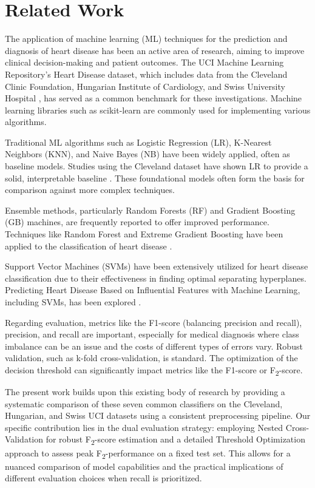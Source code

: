\documentclass{article}
\begin{document}
\section{Related Work} %
\label{sec:related_work} %

The application of machine learning (ML) techniques for the prediction and diagnosis of heart disease has been an active area of research, aiming to improve clinical decision-making and patient outcomes. The UCI Machine Learning Repository's Heart Disease dataset, which includes data from the Cleveland Clinic Foundation, Hungarian Institute of Cardiology, and Swiss University Hospital \cite{UCIHeart}, has served as a common benchmark for these investigations. Machine learning libraries such as scikit-learn \cite{scikit-learn} are commonly used for implementing various algorithms.

Traditional ML algorithms such as Logistic Regression (LR), K-Nearest Neighbors (KNN), and Naive Bayes (NB) have been widely applied, often as baseline models. Studies using the Cleveland dataset have shown LR to provide a solid, interpretable baseline \cite{Paul2021}. These foundational models often form the basis for comparison against more complex techniques.

Ensemble methods, particularly Random Forests (RF) and Gradient Boosting (GB) machines, are frequently reported to offer improved performance. Techniques like Random Forest and Extreme Gradient Boosting have been applied to the classification of heart disease \cite{Pratama2023}.

Support Vector Machines (SVMs) have been extensively utilized for heart disease classification due to their effectiveness in finding optimal separating hyperplanes. Predicting Heart Disease Based on Influential Features with Machine Learning, including SVMs, has been explored \cite{Dubey2021}.

Regarding evaluation, metrics like the F1-score (balancing precision and recall), precision, and recall are important, especially for medical diagnosis where class imbalance can be an issue and the costs of different types of errors vary. Robust validation, such as k-fold cross-validation, is standard. The optimization of the decision threshold can significantly impact metrics like the F1-score or F\textsubscript{2}-score.

The present work builds upon this existing body of research by providing a systematic comparison of these seven common classifiers on the Cleveland, Hungarian, and Swiss UCI datasets using a consistent preprocessing pipeline. Our specific contribution lies in the dual evaluation strategy: employing Nested Cross-Validation for robust F\textsubscript{2}-score estimation and a detailed Threshold Optimization approach to assess peak F\textsubscript{2}-performance on a fixed test set. This allows for a nuanced comparison of model capabilities and the practical implications of different evaluation choices when recall is prioritized.
\end{document}
